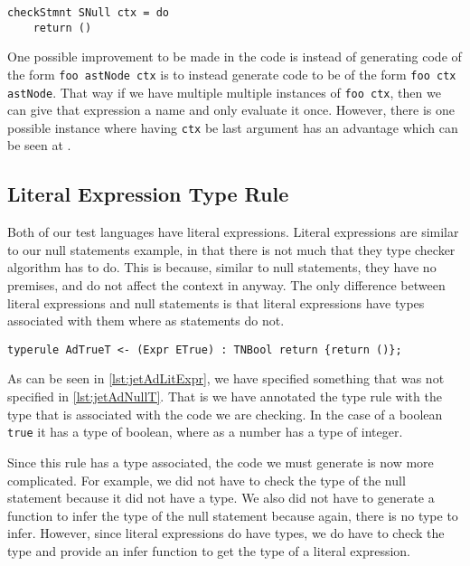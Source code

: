 \begin{lstlisting}[caption = Code generated from AdNullT, label=lst:codeAdNullT]
checkStmnt SNull ctx = do
    return ()
\end{lstlisting}

One possible improvement to be made in the code is instead of generating code of the form \texttt{foo astNode ctx} is to instead generate code to be of the form \texttt{foo ctx astNode}.
That way if we have multiple multiple instances of \texttt{foo ctx}, then we can give that expression a name and only evaluate it once.
However, there is one possible instance where having \texttt{ctx} be last argument has an advantage which can be seen at .

\subsection{Literal Expression Type Rule}
Both of our test languages have literal expressions.
Literal expressions are similar to our null statements example, in that there is not much that they type checker algorithm has to do.
This is because, similar to null statements, they have no premises, and do not affect the context in anyway.
The only difference between literal expressions and null statements is that literal expressions have types associated with them where as statements do not.

\begin{lstlisting}[caption = JET type rule for simple literal expressions, label=lst:jetAdLitExpr]
typerule AdTrueT <- (Expr ETrue) : TNBool return {return ()};
\end{lstlisting}

As can be seen in \autoref{lst:jetAdLitExpr}, we have specified something that was not specified in \autoref{lst:jetAdNullT}.
That is we have annotated the type rule with the type that is associated with the code we are checking.
In the case of a boolean \texttt{true} it has a type of boolean, where as a number has a type of integer.

Since this rule has a type associated, the code we must generate is now more complicated.
For example, we did not have to check the type of the null statement because it did not have a type.
We also did not have to generate a function to infer the type of the null statement because again, there is no type to infer.
However, since literal expressions do have types, we do have to check the type and provide an infer function to get the type of a literal expression.

